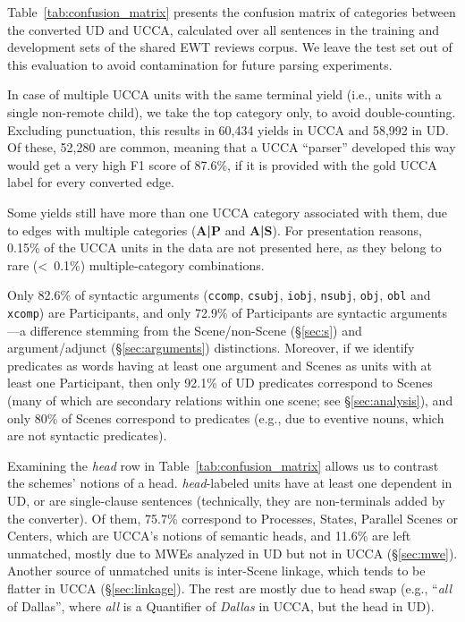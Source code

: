 \documentclass[11pt,a4paper,table]{article}
\begin{document}
Table~\ref{tab:confusion_matrix} presents the confusion matrix of categories between
the converted UD and UCCA, calculated over all sentences in the training and
development sets of the shared EWT reviews corpus.
We leave the test set out of this evaluation to avoid contamination for future
parsing experiments.

In case of multiple UCCA units with the same terminal yield (i.e., units with a single non-remote child),
we take the top category only, to avoid double-counting.
Excluding punctuation, this results in 60,434 yields in UCCA and
58,992 in UD.
Of these, 52,280 are common, meaning that a UCCA ``parser'' developed this way
would get a very high F1 score
of 87.6\%, if it is provided with the gold UCCA label for every converted edge.

Some yields still have more than one UCCA category associated with them,
due to edges with multiple categories ({\bf A\big|P} and {\bf A\big|S}).
For presentation reasons, 0.15\% of the UCCA units in the data
are not presented here, as they belong to rare (<~0.1\%)
multiple-category combinations.

Only 82.6\% of syntactic arguments
(\texttt{ccomp}, \texttt{csubj}, \texttt{iobj}, \texttt{nsubj}, \texttt{obj}, \texttt{obl} and \texttt{xcomp})
are Participants,
and only 72.9\% of Participants are syntactic arguments---a difference stemming from
the Scene/non-Scene (\S\ref{sec:s}) and argument/adjunct (\S\ref{sec:arguments}) distinctions.
Moreover, if we identify predicates as words having at least one argument
and Scenes as units with at least one Participant,
then only 92.1\% of UD predicates correspond to Scenes (many of which are secondary relations within one scene; see \S\ref{sec:analysis}),
and only 80\% of Scenes correspond to predicates (e.g., due to eventive nouns,
which are not syntactic predicates).

Examining the {\it head} row in Table~\ref{tab:confusion_matrix} allows
us to contrast the schemes' notions of a head. 
{\it head}-labeled units have at least
one dependent in UD, or are single-clause sentences (technically, they are non-terminals added by the converter).
Of them, 75.7\% correspond to Processes, States, Parallel Scenes or Centers,
which are UCCA's notions of semantic heads,
and 11.6\% are left unmatched, mostly due to MWEs analyzed in
UD but not in UCCA (\S\ref{sec:mwe}).
Another source of unmatched units is inter-Scene linkage, which tends to be flatter in
UCCA (\S\ref{sec:linkage}).
The rest are mostly due to head swap (e.g., ``\textit{all} of Dallas'', where \textit{all}
is a Quantifier of \textit{Dallas} in UCCA, but the head in UD).
\end{document}
